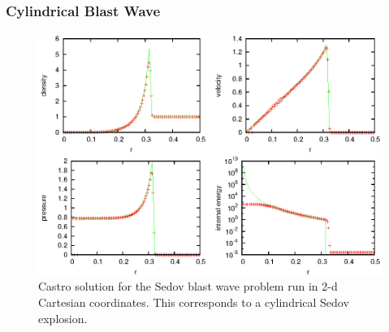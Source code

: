 \subsubsection{Cylindrical Blast Wave}

\begin{figure}[h]
\centering
\includegraphics[width=5.0in]{CastroVerification/sedov_cyl}
\caption{\label{fig:sedov_cyl} Castro solution for the Sedov blast wave problem
  run in 2-d Cartesian coordinates.  This corresponds to a cylindrical
  Sedov explosion.}
\end{figure}


